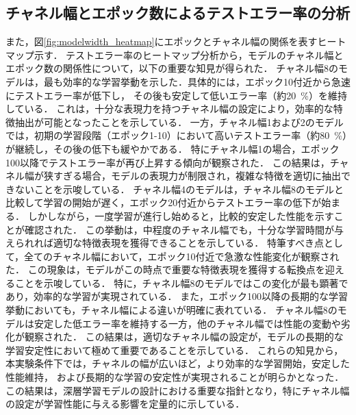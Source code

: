 \subsection{チャネル幅とエポック数によるテストエラー率の分析}
また，図\ref{fig:modelwidth_heatmap}にエポックとチャネル幅の関係を表すヒートマップ示す．
テストエラー率のヒートマップ分析から，モデルのチャネル幅とエポック数の関係性について，以下の重要な知見が得られた．
チャネル幅8のモデルは，最も効率的な学習挙動を示した．具体的には，エポック10付近から急速にテストエラー率が低下し，
その後も安定して低いエラー率（約\SI{20}{\percent}）を維持している．
これは，十分な表現力を持つチャネル幅の設定により，効率的な特徴抽出が可能となったことを示している．
一方，チャネル幅1および2のモデルでは，初期の学習段階（エポック1-10）において高いテストエラー率（約\SI{80}{\percent}）が継続し，その後の低下も緩やかである．
特にチャネル幅1の場合，エポック100以降でテストエラー率が再び上昇する傾向が観察された．
この結果は，チャネル幅が狭すぎる場合，モデルの表現力が制限され，複雑な特徴を適切に抽出できないことを示唆している．
チャネル幅4のモデルは，チャネル幅8のモデルと比較して学習の開始が遅く，エポック20付近からテストエラー率の低下が始まる．
しかしながら，一度学習が進行し始めると，比較的安定した性能を示すことが確認された．
この挙動は，中程度のチャネル幅でも，十分な学習時間が与えられれば適切な特徴表現を獲得できることを示している．
特筆すべき点として，全てのチャネル幅において，エポック10付近で急激な性能変化が観察された．
この現象は，モデルがこの時点で重要な特徴表現を獲得する転換点を迎えることを示唆している．
特に，チャネル幅8のモデルではこの変化が最も顕著であり，効率的な学習が実現されている．
また，エポック100以降の長期的な学習挙動においても，チャネル幅による違いが明確に表れている．
チャネル幅8のモデルは安定した低エラー率を維持する一方，他のチャネル幅では性能の変動や劣化が観察された．
この結果は，適切なチャネル幅の設定が，モデルの長期的な学習安定性において極めて重要であることを示している．
これらの知見から，本実験条件下では，チャネルの幅が広いほど，より効率的な学習開始，安定した性能維持，
および長期的な学習の安定性が実現されることが明らかとなった．この結果は，深層学習モデルの設計における重要な指針となり，特にチャネル幅の設定が学習性能に与える影響を定量的に示している．

